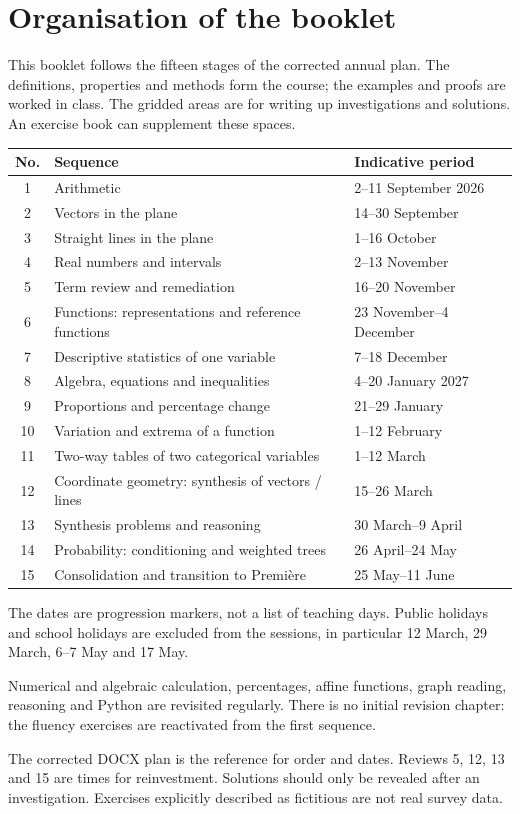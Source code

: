 \section*{Organisation of the booklet}
This booklet follows the fifteen stages of the corrected annual plan. The definitions, properties and methods form the course; the examples and proofs are worked in class. The gridded areas are for writing up investigations and solutions. An exercise book can supplement these spaces.
\begin{center}\small{}\begin{tabularx}{\linewidth}{c X l}
\textbf{No.}&\textbf{Sequence}&\textbf{Indicative period}\\\hline
1&Arithmetic&2--11 September 2026\\
2&Vectors in the plane&14--30 September\\
3&Straight lines in the plane&1--16 October\\
4&Real numbers and intervals&2--13 November\\
5&Term review and remediation&16--20 November\\
6&Functions: representations and reference functions&23 November--4 December\\
7&Descriptive statistics of one variable&7--18 December\\
8&Algebra, equations and inequalities&4--20 January 2027\\
9&Proportions and percentage change&21--29 January\\
10&Variation and extrema of a function&1--12 February\\
11&Two-way tables of two categorical variables&1--12 March\\
12&Coordinate geometry: synthesis of vectors / lines&15--26 March\\
13&Synthesis problems and reasoning&30 March--9 April\\
14&Probability: conditioning and weighted trees&26 April--24 May\\
15&Consolidation and transition to Première&25 May--11 June\\\hline
\end{tabularx}\end{center}
The dates are progression markers, not a list of teaching days. Public holidays and school holidays are excluded from the sessions, in particular 12 March, 29 March, 6--7 May and 17 May.
\begin{keypoint}
Numerical and algebraic calculation, percentages, affine functions, graph reading, reasoning and Python are revisited regularly. There is no initial revision chapter: the fluency exercises are reactivated from the first sequence.
\end{keypoint}
\begin{teachernote}The corrected DOCX plan is the reference for order and dates. Reviews 5, 12, 13 and 15 are times for reinvestment. Solutions should only be revealed after an investigation. Exercises explicitly described as fictitious are not real survey data.\end{teachernote}
\tableofcontents
